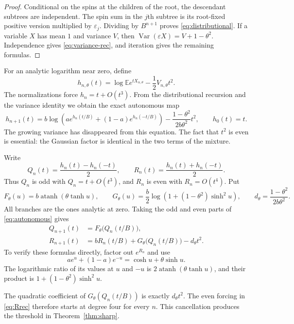 \documentclass[11pt]{article}
\theoremstyle{definition}
\newcommand{\E}{\mathbb E}
\newcommand{\Var}{\operatorname{Var}}
\newcommand{\atanh}{\operatorname{atanh}}
\begin{document}
\begin{proof}
Conditional on the spins at the children of the root, the descendant
subtrees are independent. The spin sum in the $j$th subtree is its
root-fixed positive version multiplied by $\varepsilon_j$. Dividing by
$B^{n+1}$ proves \eqref{eq:distributional}. If a variable $X$ has mean
$1$ and variance $V$, then
$\Var(\varepsilon X)=V+1-\theta^2$. Independence gives
\eqref{eq:variance-rec}, and iteration gives the remaining formulas.
\end{proof}

For an analytic logarithm near zero, define
\[
 h_{n,\theta}(t)=\log\E e^{tX_{n,\theta}}-\frac12V_{n,\theta}t^2.
\]
The normalizations force $h_n=t+O(t^3)$. From the distributional
recursion and the variance identity we obtain the exact autonomous map
\begin{equation}\label{eq:autonomous}
 h_{n+1}(t)=b\log\!\left(ae^{h_n(t/B)}+(1-a)e^{h_n(-t/B)}\right)
                      -\frac{1-\theta^2}{2b\theta^2}t^2,
 \qquad h_0(t)=t.
\end{equation}
The growing variance has disappeared from this equation. The fact that
$t^2$ is even is essential: the Gaussian factor is identical in the two
terms of the mixture.

Write
\[
 Q_n(t)=\frac{h_n(t)-h_n(-t)}2,\qquad
 R_n(t)=\frac{h_n(t)+h_n(-t)}2.
\]
Thus $Q_n$ is odd with $Q_n=t+O(t^3)$, and $R_n$ is even with
$R_n=O(t^4)$. Put
\begin{equation}\label{eq:FG}
 F_\theta(u)=b\atanh(\theta\tanh u),\qquad
 G_\theta(u)=\frac b2\log\!\left(1+(1-\theta^2)\sinh^2u\right),
 \qquad d_\theta=\frac{1-\theta^2}{2b\theta^2}.
\end{equation}
All branches are the ones analytic at zero. Taking the odd and even
parts of \eqref{eq:autonomous} gives
\begin{align}
 Q_{n+1}(t)&=F_\theta\bigl(Q_n(t/B)\bigr),\label{eq:Qrec}\\
 R_{n+1}(t)&=bR_n(t/B)+G_\theta\bigl(Q_n(t/B)\bigr)-d_\theta t^2.
 \label{eq:Rrec}
\end{align}
To verify these formulas directly, factor out $e^{R_n}$ and use
\[
 ae^u+(1-a)e^{-u}=\cosh u+\theta\sinh u.
\]
The logarithmic ratio of its values at $u$ and $-u$ is
$2\atanh(\theta\tanh u)$, and their product is
$1+(1-\theta^2)\sinh^2u$.

The quadratic coefficient of $G_\theta(Q_n(t/B))$ is exactly
$d_\theta t^2$. The even forcing in \eqref{eq:Rrec} therefore starts
at degree four for every $n$. This cancellation produces the threshold
in Theorem~\ref{thm:sharp}.
\end{document}
